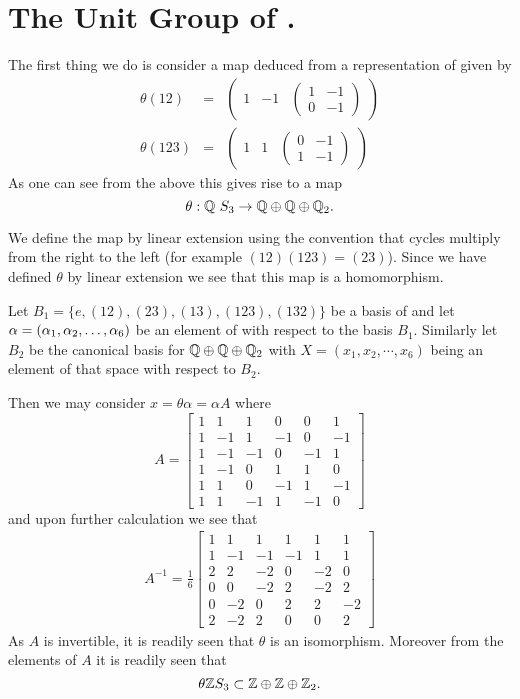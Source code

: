 \documentclass[11pt]{report}
\begin{document}
\section{The Unit Group of \intsth.}
        The first thing we do is consider a map deduced from a 
representation of \st{} given by
\begin{align*}
\theta(1 2) &=& \begin{pmatrix}
1&-1&
\begin{pmatrix}
1&-1\\
0&-1
\end{pmatrix}
\end{pmatrix}\\
\theta(1 2 3) &=& \begin{pmatrix}
1&1&
\begin{pmatrix}
0&-1\\
1&-1
\end{pmatrix}
\end{pmatrix}
\end{align*}
As one can see from the above this gives rise to a map
\[\theta:\rat~\st\to\rat\oplus\rat\oplus\rat_2.\]

We define the map by linear extension using the convention that 
cycles multiply from the
right to the left (for example $(1 2)(1 2 3) = (2 3)$). Since we 
have defined $\theta$ by linear extension
we see that this map is a homomorphism.


        Let $B_1 = \{e, (1 2), (2 3), (1 3), (1 2 3), (1 3 2)\}$ be a basis of 
\rat\st{} and let $\alpha=(\alpha_1,\series[\alpha]{2}{6})$ be an element of \rat\st{}
 with respect to the basis $B_1$. 
Similarly let $B_2$ be the canonical
basis for $\rat\oplus\rat\oplus\rat_2$ with $X = (x_1,x_2,\cdots,x_6)$
 being an element of that 
space with respect to $B_2$.

        Then we may consider $x=\theta\alpha=\alpha A$ where
\[A=
\begin{bmatrix}
1&1&1&0&0&1\\
1&-1&1&-1&0&-1\\
1&-1&-1&0&-1&1\\
1&-1&0&1&1&0\\
1&1&0&-1&1&-1\\
1&1&-1&1&-1&0
\end{bmatrix}
\]
and upon further calculation we see that
\begin{gather*}
A^{-1}=\frac{1}{6}
\begin{bmatrix}
1&1&1&1&1&1\\
        1& -1&    -1   &   -1&      1  &1\\
                2 & 2  &  -2     & 0& -2   & 0\\
	0&  0 &   -2    &  2& -2  &  2\\
                0& -2&    0&       2&2&      -2\\
                2& -2  &  2     &0&0& 2
\end{bmatrix}
\end{gather*}
        As $A$ is invertible, it is readily seen that $\theta$ is an isomorphism. 
Moreover from the
elements of $A$ it is readily seen that
\[
\theta\intgr{\st} \subset\integers\oplus\integers\oplus\integers_2.\]
\end{document}
